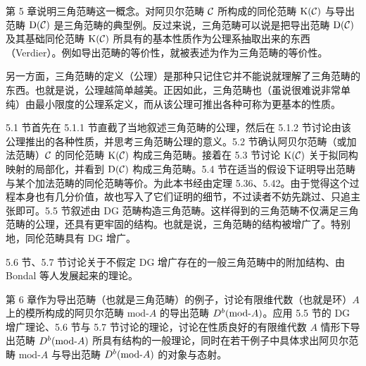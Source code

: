 
第 5 章说明三角范畴这一概念。对阿贝尔范畴 $\mathcal{C}$ 所构成的同伦范畴 $\mathrm{K}(\mathcal{C})$ 与导出范畴 $\mathrm{D}(\mathcal{C})$ 是三角范畴的典型例。反过来说，三角范畴可以说是把导出范畴 $\mathrm{D}(\mathcal{C})$ 及其基础同伦范畴 $\mathrm{K}(\mathcal{C})$ 所具有的基本性质作为公理系抽取出来的东西（Verdier）。例如导出范畴的等价性，就被表述为作为三角范畴的等价性。

另一方面，三角范畴的定义（公理）是那种只记住它并不能说就理解了三角范畴的东西。也就是说，公理越简单越美。正因如此，三角范畴也（虽说很难说非常单纯）由最小限度的公理系定义，而从该公理可推出各种可称为更基本的性质。

5.1 节首先在 5.1.1 节直截了当地叙述三角范畴的公理，然后在 5.1.2 节讨论由该公理推出的各种性质，并思考三角范畴公理的意义。5.2 节确认阿贝尔范畴（或加法范畴）$\mathcal{C}$ 的同伦范畴 $\mathrm{K}(\mathcal{C})$ 构成三角范畴。接着在 5.3 节讨论 $\mathrm{K}(\mathcal{C})$ 关于拟同构映射的局部化，并看到 $\mathrm{D}(\mathcal{C})$ 构成三角范畴。5.4 节在适当的假设下证明导出范畴与某个加法范畴的同伦范畴等价。为此本书经由定理 5.36、5.42。由于觉得这个过程本身也有几分价值，故也写入了它们证明的细节，不过读者不妨先跳过、只追主张即可。5.5 节叙述由 DG 范畴构造三角范畴。这样得到的三角范畴不仅满足三角范畴的公理，还具有更牢固的结构。也就是说，三角范畴的结构被增广了。特别地，同伦范畴具有 DG 增广。


5.6 节、5.7 节讨论关于不假定 DG 增广存在的一般三角范畴中的附加结构、由 Bondal 等人发展起来的理论。


第 6 章作为导出范畴（也就是三角范畴）的例子，讨论有限维代数（也就是环）$A$ 上的模所构成的阿贝尔范畴 $\mathrm{mod}\text{-}A$ 的导出范畴 $D^{b}(\mathrm{mod}\text{-}A)$。应用 5.5 节的 DG 增广理论、5.6 节与 5.7 节讨论的理论，讨论在性质良好的有限维代数 $A$ 情形下导出范畴 $D^{b}(\mathrm{mod}\text{-}A)$ 所具有结构的一般理论，同时在若干例子中具体求出阿贝尔范畴 $\mathrm{mod}\text{-}A$ 与导出范畴 $D^{b}(\mathrm{mod}\text{-}A)$ 的对象与态射。

